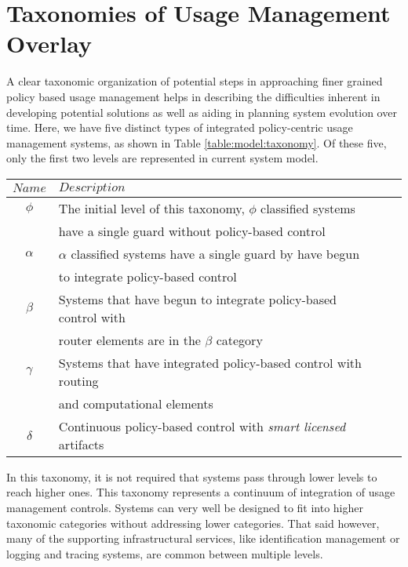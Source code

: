 \section{Taxonomies of Usage Management Overlay}
A clear taxonomic organization of potential steps in approaching finer grained policy based usage management helps in describing the difficulties inherent in developing potential solutions as well as aiding in planning system evolution over time. Here, we have five distinct types of integrated policy-centric usage management systems, as shown in Table \ref{table:model:taxonomy}.  Of these five, only the first two levels are represented in current system model.

\begin{table*}[tp] %
\centering %
\begin{tabular}{clcc}
\toprule %
$ Name$ 	& $Description$ \\\toprule %
$\phi$ 		& The initial level of this taxonomy, $\phi$ classified systems \\
 			& have a single guard without policy-based control \\\midrule
$\alpha$	& $\alpha$ classified systems have a single guard by have begun \\
			& to integrate policy-based control \\\midrule
$\beta$		& Systems that have begun to integrate policy-based control with \\
			& router elements are in the $\beta$ category \\\midrule
$\gamma$	& Systems that have integrated policy-based control with routing \\
			& and computational elements \\\midrule
$\delta$	& Continuous policy-based control with \textit{smart licensed} artifacts \\\bottomrule
\end{tabular}
\caption{Proposed Usage Management Taxonomy}
\label{table:model:taxonomy}
\end{table*}

In this taxonomy, it is not required that systems pass through lower levels to reach higher ones.  This taxonomy represents a continuum of integration of usage management controls.  Systems can very well be designed to fit into higher taxonomic categories without addressing lower categories.  That said however, many of the supporting infrastructural services, like identification management or logging and tracing systems, are common between multiple levels.

